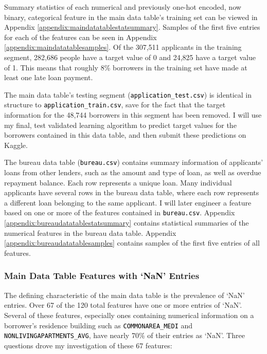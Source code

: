 \documentclass[12pt, letterpaper]{article}
\begin{document}
Summary statistics of each numerical and previously one-hot encoded, now binary, categorical feature in the main data table's training set can be viewed in Appendix \ref{appendix:maindatatablestatsummary}. Samples of the first five entries for each of the features can be seen in Appendix \ref{appendix:maindatatablesamples}. Of the 307,511 applicants in the training segment, 282,686 people have a target value of 0 and 24,825 have a target value of 1. This means that roughly 8\% borrowers in the training set have made at least one late loan payment.

The main data table's testing segment (\colorbox{backcolor}{\textcolor{black}{\texttt{application_test.csv}}}) is identical in structure to \colorbox{backcolor}{\textcolor{black}{\texttt{application_train.csv}}}, save for the fact that the target information for the 48,744 borrowers in this segment has been removed. I will use my final, test validated learning algorithm to predict target values for the borrowers contained in this data table, and then submit these predictions on Kaggle.

The bureau data table (\colorbox{backcolor}{\textcolor{black}{\texttt{bureau.csv}}}) contains summary information of applicants' loans from other lenders, such as the amount and type of loan, as well as overdue repayment balance. Each row represents a unique loan. Many individual applicants have several rows in the bureau data table, where each row represents a different loan belonging to the same applicant. I will later engineer a feature based on one or more of the features contained in \colorbox{backcolor}{\textcolor{black}{\texttt{bureau.csv}}}. Appendix \ref{appendix:bureaudatatablestatsummary} contains statistical summaries of the numerical features in the bureau data table. Appendix \ref{appendix:bureaudatatablesamples} contains samples of the first five entries of all features.

\subsubsection{Main Data Table Features with `NaN' Entries}
The defining characteristic of the main data table is the prevalence of `NaN' entries. Over 67 of the 120 total features have one or more entries of `NaN'. Several of these features, especially ones containing numerical information on a borrower's residence building such as \colorbox{backcolor}{\textcolor{black}{\texttt{COMMONAREA_MEDI}}} and
\colorbox{backcolor}{\textcolor{black}{\texttt{NONLIVINGAPARTMENTS_AVG}}}, have nearly 70\% of their entries as `NaN'. Three questions drove my investigation of these 67 features:
\end{document}

